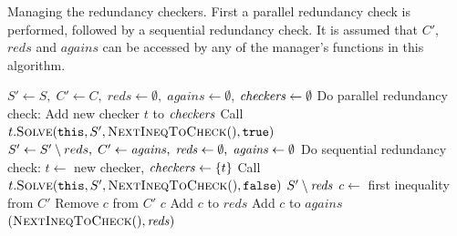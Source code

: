 \begin{algorithm}[htbp]
\begin{algorithmic}[1]\caption{Managing the redundancy checkers. First a parallel redundancy check is performed, followed by a sequential redundancy check. It is assumed that $C'$, $\mathit{reds}$ and $\mathit{agains}$ can be accessed by any of the manager's functions in this algorithm.}\label{alg:manager}
	\State $S'\gets S,\; C'\gets C,\; \mathit{reds} \gets \emptyset,\; \mathit{agains} \gets \emptyset$, $\mathit{checkers} \gets \emptyset$ 		
\State Do parallel redundancy check:
\Indent
		\State Add new checker $t$ to $\mathit{checkers}$
		\State Call $t.\Call{Solve}{\texttt{this}, S', \textsc{NextIneqToCheck}(), \true}$ 
\EndIndent
\State
\State $S'\gets S'\setminus reds,\; C'\gets \mathit{agains},\; \mathit{reds} \gets \emptyset,\; \mathit{agains} \gets \emptyset$
\State Do sequential redundancy check:
\Indent
		\State $t\gets $ new checker, $\mathit{checkers} \gets \{t\}$ 		
		\State Call $t.\Call{Solve}{\texttt{this}, S', \textsc{NextIneqToCheck}(), \false}$		
	\EndIf
\EndIndent
\State \Return $S'\setminus \mathit{reds}$ 
\EndFunction
\State
{}
			\State\Return \nul
		\Else
			\State $c \gets$ first inequality from $C'$
			\State Remove $c$ from $C'$
			\State \Return $c$
		\EndIf
\EndFunction
\State
{}\label{line:manageResult}
		\State Add $c$ to $\mathit{reds}$
			\State Add $c$ to $\mathit{agains}$ 
	\EndIf
	\State \Return $(\Call{NextIneqToCheck}{\null}, \mi{reds})$
\EndFunction
\State
\end{algorithmic}		
\end{algorithm}
%
